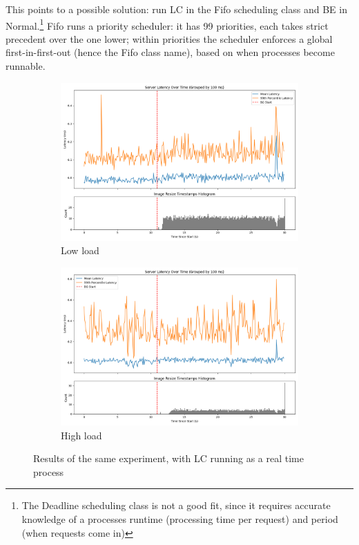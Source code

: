 This points to a possible solution: run LC in the Fifo scheduling class and BE
in Normal.\footnote{The Deadline scheduling class is not a good fit, since it
requires accurate knowledge of a processes runtime (processing time per request)
and period (when requests come in)} Fifo runs a priority scheduler: it has 99
priorities, each takes strict precedent over the one lower; within priorities
the scheduler enforces a global first-in-first-out (hence the Fifo class name),
based on when processes become runnable.

\begin{figure}[t]
    \centering
    \begin{subfigure}[t]{0.48\columnwidth}
        \includegraphics[width=\columnwidth]{graphs/unedited-rt-low-two.png}
        \caption{Low load}\label{fig:unedited-rt-low-two}
    \end{subfigure}
    \hspace{\fill}
    \begin{subfigure}[t]{0.48\columnwidth}
        \includegraphics[width=\columnwidth]{graphs/unedited-rt-high-two.png}
        \caption{High load}\label{fig:unedited-rt-high-two}
    \end{subfigure}
    \vspace{4pt}
    \caption{Results of the same experiment, with LC running as a real time process}\label{fig:unedited-rt}
\end{figure}

